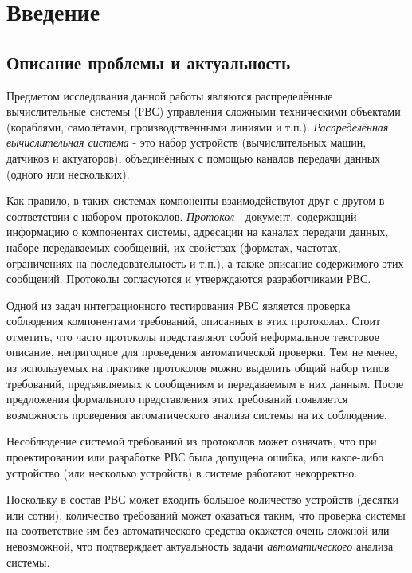 \section{Введение}

\subsection{Описание проблемы и актуальность}

Предметом исследования данной работы являются распределённые вычислительные 
системы (РВС) управления сложными техническими объектами (кораблями, 
самолётами, производственными линиями и т.п.). \textit{Распределённая 
вычислительная система} - это набор устройств (вычислительных машин, датчиков и 
актуаторов), объединённых с помощью каналов передачи данных (одного или 
нескольких). 

Как правило, в таких системах компоненты взаимодействуют друг с другом в 
соответствии с набором протоколов. \textit{Протокол} - документ, содержащий 
информацию о компонентах системы, адресации на каналах передачи данных, наборе 
передаваемых сообщений, их свойствах (форматах, частотах, ограничениях на 
последовательность и т.п.), а также описание содержимого этих сообщений. 
Протоколы согласуются и утверждаются разработчиками РВС.

Одной из задач интеграционного тестирования РВС является проверка соблюдения 
компонентами требований, описанных в этих протоколах. Стоит отметить, 
что часто протоколы представляют собой неформальное текстовое описание, 
непригодное для проведения автоматической проверки. Тем не менее, из 
используемых на практике протоколов можно выделить общий набор типов требований, 
предъявляемых к сообщениям и передаваемым в них данным. После предложения 
формального представления этих требований появляется возможность проведения 
автоматического анализа системы на их соблюдение.

Несоблюдение системой требований из протоколов может означать, что при 
проектировании или разработке РВС была допущена ошибка, или какое-либо 
устройство (или несколько устройств) в системе работают некорректно.

Поскольку в состав РВС может входить большое количество устройств (десятки или 
сотни), количество требований может оказаться таким, что проверка системы на 
соответствие им без автоматического средства окажется очень сложной или 
невозможной, что подтверждает актуальность задачи \textit{автоматического} 
анализа системы.

